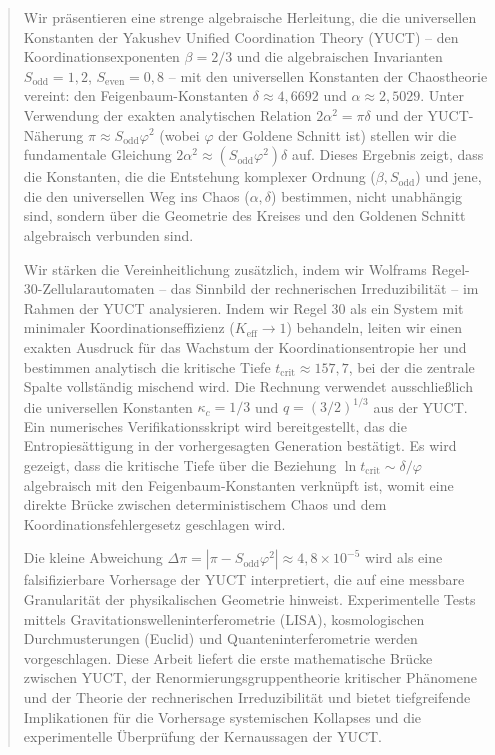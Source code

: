 \documentclass[12pt,a4paper]{article}
\begin{document}
	\newpage
	\begin{abstract}
		\noindent
		Wir präsentieren eine strenge algebraische Herleitung, die die universellen Konstanten der Yakushev Unified Coordination Theory (YUCT) – den Koordinationsexponenten \(\beta = 2/3\) und die algebraischen Invarianten \(S_{\mathrm{odd}} = 1{,}2\), \(S_{\mathrm{even}} = 0{,}8\) – mit den universellen Konstanten der Chaostheorie vereint: den Feigenbaum-Konstanten \(\delta \approx 4{,}6692\) und \(\alpha \approx 2{,}5029\). Unter Verwendung der exakten analytischen Relation \(2\alpha^2 = \pi\delta\) und der YUCT-Näherung \(\pi \approx S_{\mathrm{odd}}\varphi^2\) (wobei \(\varphi\) der Goldene Schnitt ist) stellen wir die fundamentale Gleichung \(2\alpha^2 \approx (S_{\mathrm{odd}}\varphi^2)\delta\) auf. Dieses Ergebnis zeigt, dass die Konstanten, die die Entstehung komplexer Ordnung (\(\beta, S_{\mathrm{odd}}\)) und jene, die den universellen Weg ins Chaos (\(\alpha, \delta\)) bestimmen, nicht unabhängig sind, sondern über die Geometrie des Kreises und den Goldenen Schnitt algebraisch verbunden sind.
		
		Wir stärken die Vereinheitlichung zusätzlich, indem wir Wolframs Regel-30-Zellularautomaten – das Sinnbild der rechnerischen Irreduzibilität – im Rahmen der YUCT analysieren. Indem wir Regel 30 als ein System mit minimaler Koordinationseffizienz (\(K_{\mathrm{eff}} \to 1\)) behandeln, leiten wir einen exakten Ausdruck für das Wachstum der Koordinationsentropie her und bestimmen analytisch die kritische Tiefe \(t_{\mathrm{crit}} \approx 157{,}7\), bei der die zentrale Spalte vollständig mischend wird. Die Rechnung verwendet ausschließlich die universellen Konstanten \(\kappa_c = 1/3\) und \(q = (3/2)^{1/3}\) aus der YUCT. Ein numerisches Verifikationsskript wird bereitgestellt, das die Entropiesättigung in der vorhergesagten Generation bestätigt. Es wird gezeigt, dass die kritische Tiefe über die Beziehung \(\ln t_{\mathrm{crit}} \sim \delta/\varphi\) algebraisch mit den Feigenbaum-Konstanten verknüpft ist, womit eine direkte Brücke zwischen deterministischem Chaos und dem Koordinationsfehlergesetz geschlagen wird.
		
		Die kleine Abweichung \(\Delta\pi = |\pi - S_{\mathrm{odd}}\varphi^2| \approx 4{,}8\times10^{-5}\) wird als eine falsifizierbare Vorhersage der YUCT interpretiert, die auf eine messbare Granularität der physikalischen Geometrie hinweist. Experimentelle Tests mittels Gravitationswelleninterferometrie (LISA), kosmologischen Durchmusterungen (Euclid) und Quanteninterferometrie werden vorgeschlagen. Diese Arbeit liefert die erste mathematische Brücke zwischen YUCT, der Renormierungsgruppentheorie kritischer Phänomene und der Theorie der rechnerischen Irreduzibilität und bietet tiefgreifende Implikationen für die Vorhersage systemischen Kollapses und die experimentelle Überprüfung der Kernaussagen der YUCT.
	\end{abstract}
	
\end{document}
